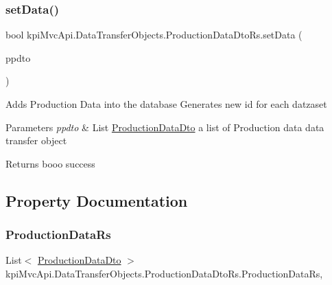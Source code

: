 \subsubsection{\texorpdfstring{set\+Data()}{setData()}\hspace{0.1cm}{\footnotesize\ttfamily [2/2]}}
{\footnotesize\ttfamily bool kpi\+Mvc\+Api.\+Data\+Transfer\+Objects.\+Production\+Data\+Dto\+Rs.\+set\+Data (\begin{DoxyParamCaption}\item[{List$<$ \hyperlink{classkpi_mvc_api_1_1_data_transfer_objects_1_1_production_data_dto}{Production\+Data\+Dto} $>$}]{ppdto }\end{DoxyParamCaption})\hspace{0.3cm}{\ttfamily [inline]}}



Adds Production Data into the database Generates new id for each datzaset 


\begin{DoxyParams}{Parameters}
{\em ppdto} & {\ttfamily  List \hyperlink{classkpi_mvc_api_1_1_data_transfer_objects_1_1_production_data_dto}{Production\+Data\+Dto} } a list of Production data data transfer object \\
\hline
\end{DoxyParams}
\begin{DoxyReturn}{Returns}
{\ttfamily booo} success
\end{DoxyReturn}


\subsection{Property Documentation}
\mbox{\label{classkpi_mvc_api_1_1_data_transfer_objects_1_1_production_data_dto_rs_a4f6705f015bff504dffa7567f1df1296}} 
\subsubsection{\texorpdfstring{Production\+Data\+Rs}{ProductionDataRs}}
{\footnotesize\ttfamily List$<$ \hyperlink{classkpi_mvc_api_1_1_data_transfer_objects_1_1_production_data_dto}{Production\+Data\+Dto} $>$ kpi\+Mvc\+Api.\+Data\+Transfer\+Objects.\+Production\+Data\+Dto\+Rs.\+Production\+Data\+Rs\hspace{0.3cm}{\ttfamily [get]}, {\ttfamily [set]}}



